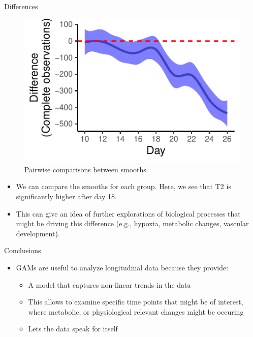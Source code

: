 \documentclass[
  ignorenonframetext,
]{beamer}
\begin{document}
\begin{frame}{Differences}
\protect\hypertarget{differences}{}
\begin{figure}

{\centering \includegraphics{MfPH_Next_Generation_AM_March_2023_files/figure-beamer/differences-1.pdf}

}

\caption{Pairwise comparisons between smooths}

\end{figure}

\begin{itemize}[<+->]
\item
  We can compare the smooths for each group. Here, we see that T2 is
  significantly higher after \approx day 18.
\item
  This can give an idea of further explorations of biological processes
  that might be driving this difference (e.g., hypoxia, metabolic
  changes, vascular development).
\end{itemize}
\end{frame}

\begin{frame}{Conclusions}
\protect\hypertarget{conclusions-1}{}
\begin{itemize}[<+->]
\item
  GAMs are useful to analyze longitudinal data because they provide:

  \begin{itemize}[<+->]
  \item
    A model that captures non-linear trends in the data
  \item
    This allows to examine specific time points that might be of
    interest, where metabolic, or physiological relevant changes might
    be occuring
  \item
    Lets the data speak for itself
  \end{itemize}
\end{itemize}
\end{frame}
\end{document}
